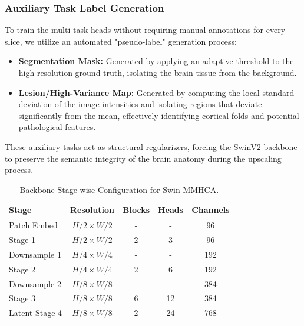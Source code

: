 \subsubsection{Auxiliary Task Label Generation}
To train the multi-task heads without requiring manual annotations for every slice, we utilize an automated "pseudo-label" generation process:
\begin{itemize}
    \item \textbf{Segmentation Mask:} Generated by applying an adaptive threshold to the high-resolution ground truth, isolating the brain tissue from the background.
    \item \textbf{Lesion/High-Variance Map:} Generated by computing the local standard deviation of the image intensities and isolating regions that deviate significantly from the mean, effectively identifying cortical folds and potential pathological features.
\end{itemize}
These auxiliary tasks act as structural regularizers, forcing the SwinV2 backbone to preserve the semantic integrity of the brain anatomy during the upscaling process.

\begin{table}[H]
\centering
\caption{Backbone Stage-wise Configuration for Swin-MMHCA.}
\label{tab:backbone_specs}
\begin{tabular}{lcccc}
\toprule
\textbf{Stage} & \textbf{Resolution} & \textbf{Blocks} & \textbf{Heads} & \textbf{Channels} \\
\midrule
Patch Embed & $H/2 \times W/2$ & - & - & 96 \\
Stage 1 & $H/2 \times W/2$ & 2 & 3 & 96 \\
Downsample 1 & $H/4 \times W/4$ & - & - & 192 \\
Stage 2 & $H/4 \times W/4$ & 2 & 6 & 192 \\
Downsample 2 & $H/8 \times W/8$ & - & - & 384 \\
Stage 3 & $H/8 \times W/8$ & 6 & 12 & 384 \\
Latent Stage 4 & $H/8 \times W/8$ & 2 & 24 & 768 \\
\bottomrule
\end{tabular}
\end{table}
